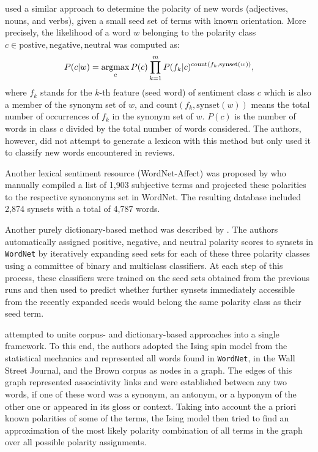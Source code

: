 \citet{Kim:04} used a similar approach to determine the polarity of
new words (adjectives, nouns, and verbs), given a small seed set of
terms with known orientation.  More precisely, the likelihood of a
word $w$ belonging to the polarity class $c \in {\textrm{postive},
  \textrm{negative}, \textrm{neutral}}$ was computed as:
\begin{equation*}
  P(c|w) = \argmax_{c}P(c)\prod_{k=1}^{m}{P(f_k|c)^{\textrm{count}(f_k,\textrm{synset}(w))}},
\end{equation*}
where $f_k$ stands for the $k$-th feature (seed word) of sentiment
class $c$ which is also a member of the synonym set of $w$, and
$\textrm{count}(f_k,\textrm{synset}(w))$ means the total number of
occurrences of $f_k$ in the synonym set of $w$.  $P(c)$ is the number
of words in class $c$ divided by the total number of words considered.
The authors, however, did not attempt to generate a lexicon with this
method but only used it to classify new words encountered in reviews.

Another lexical sentiment resource (WordNet-Affect) was proposed by
\citet{Strapparava:04} who manually compiled a list of 1,903
subjective terms and projected these polarities to the respective
synononyms set in WordNet.  The resulting database included 2,874
synsets with a total of 4,787 words.

Another purely dictionary-based method was described by
\citet{Esuli:06b}.  The authors automatically assigned positive,
negative, and neutral polarity scores to synsets in \texttt{WordNet}
by iteratively expanding seed sets for each of these three polarity
classes using a committee of binary and multiclass classifiers.  At
each step of this process, these classifiers were trained on the seed
sets obtained from the previous runs and then used to predict whether
further synsets immediately accessible from the recently expanded
seeds would belong the same polarity class as their seed term.

\citet{Takamura:05} attempted to unite corpus- and dictionary-based
approaches into a single framework.  To this end, the authors adopted
the Ising spin model from the statistical mechanics and represented
all words found in \texttt{WordNet}, in the Wall Street Journal, and
the Brown corpus as nodes in a graph.  The edges of this graph
represented associativity links and were established between any two
words, if one of these word was a synonym, an antonym, or a hyponym of
the other one or appeared in its gloss or context.  Taking into
account the a priori known polarities of some of the terms, the Ising
model then tried to find an approximation of the most likely polarity
combination of all terms in the graph over all possible polarity
assignments.

